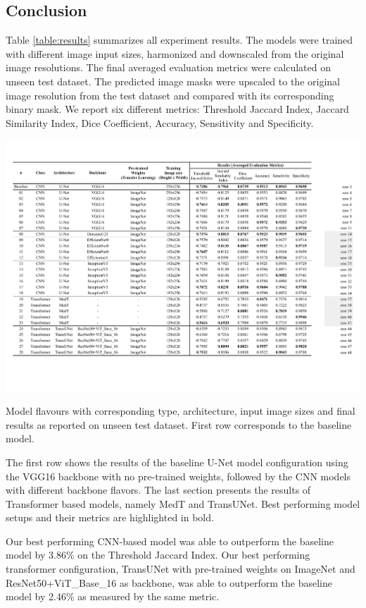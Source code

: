 \subsection{Conclusion}

Table \ref{table:results} summarizes all experiment results. The models were trained with different image input sizes, harmonized and downscaled from the original image resolutions. The final averaged evaluation metrics were calculated on unseen test dataset. The predicted image masks were upscaled to the original image resolution from the test dataset and compared with its corresponding binary mask. We report six different metrics: Threshold Jaccard Index, Jaccard Similarity Index, Dice Coefficient, Accuracy, Sensitivity and Specificity.

\begin{table}[ht]
  \centering
  \includegraphics[width=\textwidth]{assets/results.pdf}
  \caption[Results]{Model flavours with corresponding type, architecture, input image sizes and final results as reported on unseen test dataset. First row corresponds to the baseline model.}
  \label{table:results}
\end{table}

The first row shows the results of the baseline U-Net model configuration using the VGG16 backbone with no pre-trained weights, followed by the CNN models with different backbone  flavors. The last section presents the results of Transformer based models, namely MedT and TransUNet. Best performing model setups and their metrics are highlighted in bold.

\par
Our best performing CNN-based model was able to outperform the baseline model by 3.86\% on the Threshold Jaccard Index. Our best performing transformer configuration, TransUNet with pre-trained weights on ImageNet and ResNet50+ViT\_Base\_16 as backbone, was able to outperform the baseline model by 2.46\% as measured by the same metric.

